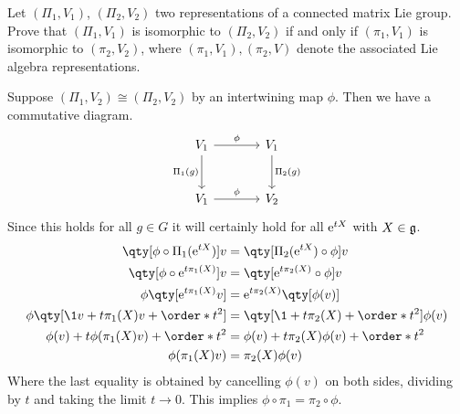 \documentclass[
	pages,
	boxes,
	color=WildStrawberry
]{homework}
\begin{document}
\begin{problem}
Let $(\Pi_1, V_1)$, $(\Pi_2, V_2)$ two representations of a connected matrix Lie group. Prove that $(\Pi_1, V_1)$ is isomorphic to $(\Pi_2, V_2)$ if and only if $(\pi_1, V_1)$ is isomorphic to $(\pi_2, V_2)$, where $(\pi_1, V_1), (\pi_2, V)$ denote the associated Lie algebra representations.
\end{problem}

\begin{solution}
	Suppose $(\Pi_1, V_2)\cong (\Pi_2, V_2)$ by an intertwining map $\phi$. Then we have a commutative diagram.
	\begin{equation*}
		\begin{tikzcd}[row sep=large, column sep=large]
			V_1 \arrow{r}{\phi} \arrow[swap]{d}{\Pi_1(g)} & V_1 \arrow{d}{\Pi_2(g)} \\
			V_1 \arrow{r}{\phi} & V_2
		\end{tikzcd}
	\end{equation*}
	Since this holds for all $g\in G$ it will certainly hold for all $\mathrm{e}^{tX}$ with $X\in\mathfrak{g}$.
	\begin{align*}
		\qty[\phi\circ \Pi_1(\e^{tX})]v            & = \qty[\Pi_2(\e^{tX})\circ\phi]v             \\
		\qty[\phi\circ \e^{t\pi_1(X)}]v            & = \qty[\e^{t\pi_2(X)}\circ \phi]v            \\
		\phi\qty[\e^{t\pi_1(X)}v]                  & = \e^{t\pi_2(X)}\qty[\phi(v)]                \\
		\phi\qty[\1 v + t\pi_1(X)v + \order*{t^2}] & = \qty[\1 + t\pi_2(X) + \order*{t^2}]\phi(v) \\
		\phi(v) + t\phi(\pi_1(X)v) + \order*{t^2}  & = \phi(v) + t\pi_2(X)\phi(v) + \order*{t^2}  \\
		\phi(\pi_1(X)v)                            & = \pi_2(X)\phi(v)
	\end{align*}
	Where the last equality is obtained by cancelling $\phi(v)$ on both sides, dividing by $t$ and taking the limit $t\to 0$. This implies $\phi\circ \pi_1 = \pi_2\circ \phi$.


\end{solution}
\end{document}
